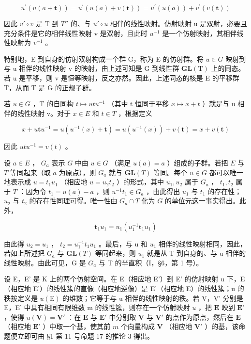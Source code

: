 \[
u ^ {\prime} (u (a + \mathbf {t})) = u ^ {\prime} (u (a) + v (\mathbf {t})) = u ^ {\prime} (u (a)) + v ^ {\prime} (v (\mathbf {t}))
\]

因此 \(v'\circ v\) 是 T 到 \(T''\) 的、与 \(u'\circ u\) 相伴的线性映射。仿射映射 u 是双射，必要且充分条件是它的相伴线性映射 v 是双射，且此时 \(u^{-1}\) 是一个仿射映射，其相伴线性映射为 \(v^{-1}\) 。

特别地，E 到自身的仿射双射构成一个群 G，称为 E 的仿射群。将 \(u \in G\) 映射到与 u 相伴的线性映射 v 的映射，由上述可知是 G 到线性群 \(\mathbf{GL}(\mathrm{T})\) 上的同态。若 u 是平移，则 v 是恒等映射，反之亦然。因此，上述同态的核是 E 的平移群 T，从而 T 是 G 的正规子群。

若 \(u \in G\) ，T 的自同构 \(t \mapsto utu^{-1}\) （其中 t 恒同于平移 \(x \mapsto x + t\) ）就是与 u 相伴的线性映射 v。对于 \(x \in E\) 和 \(t \in T\) ，根据定义

\[
x + u \mathbf {t} u ^ {- 1} = u (u ^ {- 1} (x) + \mathbf {t}) = u (u ^ {- 1} (x)) + v (\mathbf {t}) = x + v (\mathbf {t})
\]

因此 \(utu^{-1} = v(t)\) 。

设 \(a \in E\) ， \(G_a\) 表示 \(G\) 中由 \(u \in G\) （满足 \(u(a) = a\) ）组成的子群。若把 \(E\) 与 \(T\) 等同起来（取 \(a\) 为原点），则 \(G_a\) 就与 \(\mathbf{GL}(T)\) 等同。每个 \(u \in G\) 都可以唯一地表示成 \(u = t_1 u_1\) （相应地 \(u = u_2 t_2\) ）的形式，其中 \(u_1, u_2\) 属于 \(G_a\) ， \(t_1, t_2\) 属于 \(T\) ：因为令 \(t_1 = u(a) - a\) ，则 \(u^{-1} t_1 \in G_a\) ，由此得出 \(u_1\) 与 \(t_1\) 的存在性； \(u_2\) 与 \(t_2\) 的存在性同理可得。唯一性由 \(G_a \cap T\) 化为 \(G\) 的单位元这一事实得出。此外，

\[
\mathbf {t} _ {1} u _ {1} = u _ {1} (u _ {1} ^ {- 1} \mathbf {t} _ {1} u _ {1})
\]

由此得 \(u_{2}=u_{1}\) ， \(t_{2}=u_{1}^{-1}t_{1}u_{1}\) 。最后，与 u 和 \(u_{1}\) 相伴的线性映射相同，因此，若如上所述把 \(G_{a}\) 与 \(\mathbf{GL}(T)\) 等同起来，则 \(u_{1}\) 就是从 T 到自身的、与 u 相伴的线性映射。由此可见，G 是 \(G_{a}\) 与 T 的半直积（I，§6，第 1 号）。

设 E，E' 是 K 上的两个仿射空间。在 E（相应地 E'）到 E' 的仿射映射 u 下，E（相应地 E'）的线性簇的直像（相应地逆像）是 E'（相应地 E）的线性簇；u 的秩按定义是 \(u(\mathrm{E})\) 的维数；它等于与 u 相伴的线性映射的秩。若 V，V' 分别是 E，E' 中具有相同有限维数 m 的线性簇，则存在一个仿射映射 \(u\) ，把 \(\mathbf{E}\) 映到 \(\mathbf{E}'\) ，使得 \(u(\mathbf{V}) = \mathbf{V}'\) ：在 \(\mathbf{E}\) 与 \(\mathbf{E}'\) 中分别取 \(\mathbf{V}\) 与 \(\mathbf{V}'\) 的点作为原点，然后在 \(\mathbf{E}\) （相应地 \(\mathbf{E}'\) ）中取一个基，使其前 \(m\) 个向量构成 \(\mathbf{V}\) （相应地 \(\mathbf{V}'\) ）的基，该命题便立即可由 §1 第 11 号命题 17 的推论 3 得出。

